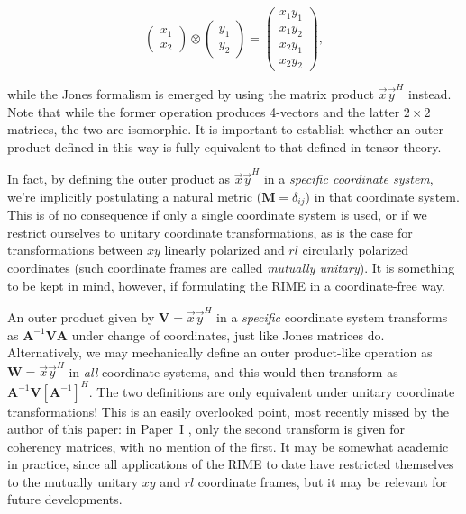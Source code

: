 \documentclass[]{aa}
\newcommand{\herm}{H}
\begin{document}
\[
\left( \begin{array}{c}x_1\\x_2\end{array} \right)\otimes
\left( \begin{array}{c}y_1\\y_2\end{array} \right) = 
\left( \begin{array}{c}x_1y_1\\x_1y_2\\x_2y_1\\x_2y_2\end{array} \right),
\]

while the Jones formalism is emerged \citep[Sect.~1]{ME4,RRIME1} by using the matrix product $\vec x \vec y^\herm$ instead. Note that while the former operation produces 4-vectors and the latter $2\times 2$ matrices, the two are isomorphic. It is important to establish whether
an outer product defined in this way is fully equivalent to that defined in tensor theory.

In fact, by defining the outer product as $\vec x \vec y^\herm$ in a \emph{specific coordinate system}, we're implicitly postulating a natural metric ($\mathbf{M}=\delta_{ij}$) in that coordinate system. This is of no consequence if only a single coordinate system is used, or if we restrict ourselves to unitary coordinate transformations, as is the case for transformations between $xy$ linearly polarized and $rl$ circularly polarized coordinates (such coordinate frames are called \emph{mutually unitary\/}). It is something to be kept in mind, however, if formulating the RIME in a coordinate-free way.

An outer product given by $\mathbf{V}=\vec x \vec y^\herm$ in a \emph{specific} coordinate system transforms as $\mathbf{A}^{-1}\mathbf{V}\mathbf{A}$ under change of coordinates, just like Jones matrices do. Alternatively, we may mechanically define an outer product-like operation as $\mathbf{W}=\vec x \vec y^\herm$ in \emph{all} coordinate systems, and this would then transform as $\mathbf{A}^{-1}\mathbf{V}[\mathbf{A}^{-1}]^\herm.$ The two definitions are only equivalent under unitary coordinate transformations! This is an easily overlooked point, most recently missed by the author of this paper: in Paper~I 
\citep[Sect.~6.3]{RRIME1}, only the second transform is given for coherency matrices, with no mention of the first. It may be somewhat academic in practice, since all applications of the RIME to date have restricted themselves to the mutually unitary $xy$ and $rl$ coordinate frames, but it may be relevant for future developments.
\end{document}
